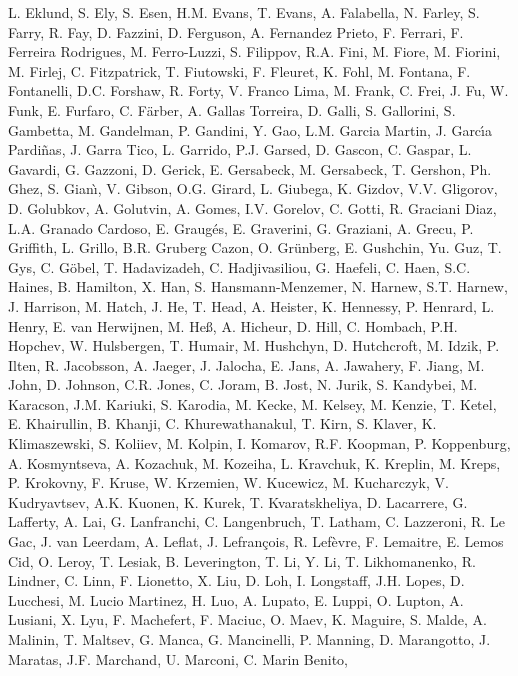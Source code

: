 L. Eklund,
S. Ely,
S. Esen,
H.M. Evans,
T. Evans,
A. Falabella,
N. Farley,
S. Farry,
R. Fay,
D. Fazzini,
D. Ferguson,
A. Fernandez Prieto,
F. Ferrari,
F. Ferreira Rodrigues,
M. Ferro-Luzzi,
S. Filippov,
R.A. Fini,
M. Fiore,
M. Fiorini,
M. Firlej,
C. Fitzpatrick,
T. Fiutowski,
F. Fleuret,
K. Fohl,
M. Fontana,
F. Fontanelli,
D.C. Forshaw,
R. Forty,
V. Franco Lima,
M. Frank,
C. Frei,
J. Fu,
W. Funk,
E. Furfaro,
C. F{\"a}rber,
A. Gallas Torreira,
D. Galli,
S. Gallorini,
S. Gambetta,
M. Gandelman,
P. Gandini,
Y. Gao,
L.M. Garcia Martin,
J. Garc{\'\i}a Pardi{\~n}as,
J. Garra Tico,
L. Garrido,
P.J. Garsed,
D. Gascon,
C. Gaspar,
L. Gavardi,
G. Gazzoni,
D. Gerick,
E. Gersabeck,
M. Gersabeck,
T. Gershon,
Ph. Ghez,
S. Gian{\`\i},
V. Gibson,
O.G. Girard,
L. Giubega,
K. Gizdov,
V.V. Gligorov,
D. Golubkov,
A. Golutvin,
A. Gomes,
I.V. Gorelov,
C. Gotti,
R. Graciani Diaz,
L.A. Granado Cardoso,
E. Graug{\'e}s,
E. Graverini,
G. Graziani,
A. Grecu,
P. Griffith,
L. Grillo,
B.R. Gruberg Cazon,
O. Gr{\"u}nberg,
E. Gushchin,
Yu. Guz,
T. Gys,
C. G{\"o}bel,
T. Hadavizadeh,
C. Hadjivasiliou,
G. Haefeli,
C. Haen,
S.C. Haines,
B. Hamilton,
X. Han,
S. Hansmann-Menzemer,
N. Harnew,
S.T. Harnew,
J. Harrison,
M. Hatch,
J. He,
T. Head,
A. Heister,
K. Hennessy,
P. Henrard,
L. Henry,
E. van Herwijnen,
M. He{\ss},
A. Hicheur,
D. Hill,
C. Hombach,
P.H. Hopchev,
W. Hulsbergen,
T. Humair,
M. Hushchyn,
D. Hutchcroft,
M. Idzik,
P. Ilten,
R. Jacobsson,
A. Jaeger,
J. Jalocha,
E. Jans,
A. Jawahery,
F. Jiang,
M. John,
D. Johnson,
C.R. Jones,
C. Joram,
B. Jost,
N. Jurik,
S. Kandybei,
M. Karacson,
J.M. Kariuki,
S. Karodia,
M. Kecke,
M. Kelsey,
M. Kenzie,
T. Ketel,
E. Khairullin,
B. Khanji,
C. Khurewathanakul,
T. Kirn,
S. Klaver,
K. Klimaszewski,
S. Koliiev,
M. Kolpin,
I. Komarov,
R.F. Koopman,
P. Koppenburg,
A. Kosmyntseva,
A. Kozachuk,
M. Kozeiha,
L. Kravchuk,
K. Kreplin,
M. Kreps,
P. Krokovny,
F. Kruse,
W. Krzemien,
W. Kucewicz,
M. Kucharczyk,
V. Kudryavtsev,
A.K. Kuonen,
K. Kurek,
T. Kvaratskheliya,
D. Lacarrere,
G. Lafferty,
A. Lai,
G. Lanfranchi,
C. Langenbruch,
T. Latham,
C. Lazzeroni,
R. Le Gac,
J. van Leerdam,
A. Leflat,
J. Lefran{\c{c}}ois,
R. Lef{\`e}vre,
F. Lemaitre,
E. Lemos Cid,
O. Leroy,
T. Lesiak,
B. Leverington,
T. Li,
Y. Li,
T. Likhomanenko,
R. Lindner,
C. Linn,
F. Lionetto,
X. Liu,
D. Loh,
I. Longstaff,
J.H. Lopes,
D. Lucchesi,
M. Lucio Martinez,
H. Luo,
A. Lupato,
E. Luppi,
O. Lupton,
A. Lusiani,
X. Lyu,
F. Machefert,
F. Maciuc,
O. Maev,
K. Maguire,
S. Malde,
A. Malinin,
T. Maltsev,
G. Manca,
G. Mancinelli,
P. Manning,
D. Marangotto,
J. Maratas,
J.F. Marchand,
U. Marconi,
C. Marin Benito,
